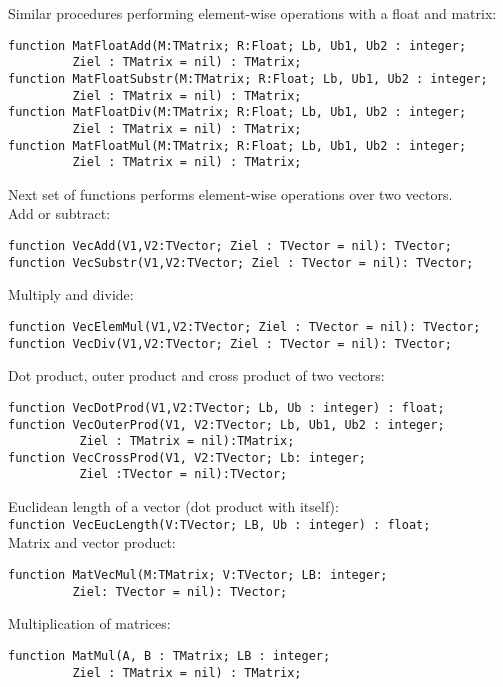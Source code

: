 \documentclass[12pt,a4paper,oneside]{article}
\newcommand{\code}[1]{\texttt{#1}}
\begin{document}
Similar procedures performing element-wise operations with a float and matrix:\vspace{-6pt}
\begin{verbatim}  
function MatFloatAdd(M:TMatrix; R:Float; Lb, Ub1, Ub2 : integer; 
         Ziel : TMatrix = nil) : TMatrix;
function MatFloatSubstr(M:TMatrix; R:Float; Lb, Ub1, Ub2 : integer; 
         Ziel : TMatrix = nil) : TMatrix;
function MatFloatDiv(M:TMatrix; R:Float; Lb, Ub1, Ub2 : integer; 
         Ziel : TMatrix = nil) : TMatrix;
function MatFloatMul(M:TMatrix; R:Float; Lb, Ub1, Ub2 : integer; 
         Ziel : TMatrix = nil) : TMatrix;
\end{verbatim}
Next set of functions performs element-wise operations over two vectors.\\
Add or subtract:\vspace{-6pt}
\begin{verbatim}
function VecAdd(V1,V2:TVector; Ziel : TVector = nil): TVector;
function VecSubstr(V1,V2:TVector; Ziel : TVector = nil): TVector;
\end{verbatim}
Multiply and divide:\vspace{-6pt}
\begin{verbatim}
function VecElemMul(V1,V2:TVector; Ziel : TVector = nil): TVector;
function VecDiv(V1,V2:TVector; Ziel : TVector = nil): TVector;
\end{verbatim}
Dot product, outer product and cross product of two vectors:\vspace{-6pt}
\begin{verbatim}
function VecDotProd(V1,V2:TVector; Lb, Ub : integer) : float;
function VecOuterProd(V1, V2:TVector; Lb, Ub1, Ub2 : integer; 
          Ziel : TMatrix = nil):TMatrix;
function VecCrossProd(V1, V2:TVector; Lb: integer; 
          Ziel :TVector = nil):TVector;
\end{verbatim}
Euclidean length of a vector (dot product with itself):\\
\code{function VecEucLength(V:TVector; LB, Ub : integer) : float;}\\
Matrix and vector product:
\begin{verbatim}
function MatVecMul(M:TMatrix; V:TVector; LB: integer;
         Ziel: TVector = nil): TVector;
\end{verbatim}
Multiplication of matrices:\vspace{-6pt}
\begin{verbatim}
function MatMul(A, B : TMatrix; LB : integer; 
         Ziel : TMatrix = nil) : TMatrix;
\end{verbatim}
\end{document}
